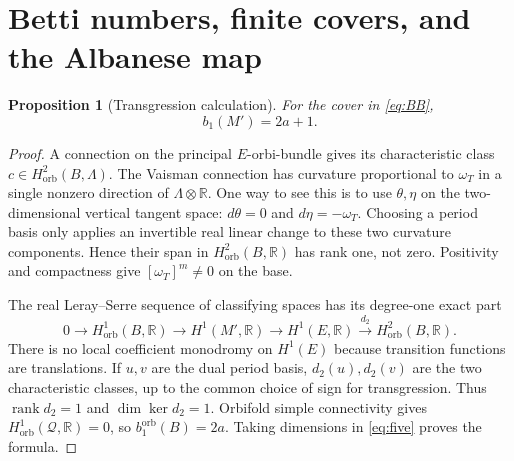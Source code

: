 \documentclass[12pt]{amsart}
\newtheorem{prop}[thm]{Proposition}
\theoremstyle{definition}
\theoremstyle{remark}
\numberwithin{equation}{section}
\newcommand{\rank}{\operatorname{rank}}
\newcommand{\orb}{\mathrm{orb}}
\newcommand{\R}{\mathbb{R}}
\newcommand{\wt}{\omega_{T}}
\newcommand{\Qfac}{\mathcal{Q}}
\begin{document}
\section{Betti numbers, finite covers, and the Albanese map}\label{sec:betti}
\begin{prop}[Transgression calculation]\label{prop:betti}
For the cover in \eqref{eq:BB},
\begin{equation}\label{eq:betti}
b_1(M')=2a+1.
\end{equation}
\end{prop}
\begin{proof}
A connection on the principal $E$-orbi-bundle gives its characteristic
class $c\in H^2_{\orb}(B,\Lambda)$. The Vaisman connection has
curvature proportional to $\wt$ in a single nonzero direction of
$\Lambda\otimes\R$. One way to see this is to use $\theta,\eta$
on the two-dimensional vertical tangent space: $d\theta=0$ and
$d\eta=-\wt$. Choosing a period basis only applies an invertible real
linear change to these two curvature components. Hence their span in
$H^2_{\orb}(B,\R)$ has rank one, not zero. Positivity and compactness
give $[\wt]^m\ne0$ on the base.

The real Leray--Serre sequence of classifying spaces has its degree-one
exact part
\begin{equation}\label{eq:five}
0\longrightarrow H^1_{\orb}(B,\R)\longrightarrow H^1(M',\R)
\longrightarrow H^1(E,\R)\xrightarrow{d_2}H^2_{\orb}(B,\R).
\end{equation}
There is no local coefficient monodromy on $H^1(E)$ because transition
functions are translations. If $u,v$ are the dual period basis,
$d_2(u),d_2(v)$ are the two characteristic classes, up to the common
choice of sign for transgression. Thus $\rank d_2=1$ and
$\dim\ker d_2=1$. Orbifold simple connectivity gives
$H^1_{\orb}(\Qfac,\R)=0$, so $b_1^{\orb}(B)=2a$. Taking dimensions
in \eqref{eq:five} proves the formula.
\end{proof}
\end{document}
